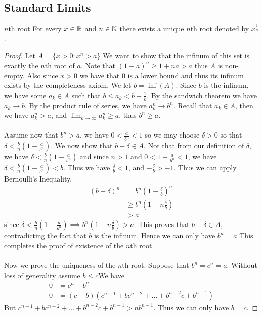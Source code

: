 \documentclass[a4paper]{article}
\begin{document}
\subsection{Standard Limits}
\begin{thm}{$n$th root}{} For every $x\in\mathbb{R}$ and $n\in\mathbb{N}$ there exists a unique $n$th root denoted by $x^\frac{1}{n}$. \tcbline
\begin{proof} Let $A=\{x>0:x^n>a\}$ We want to show that the infinum of this set is exactly the $n$th root of $a$. Note that $(1+a)^n\geq1+na>a$ thus $A$ is non-empty. Also since $x>0$ we have that $0$ is a lower bound and thus its infinum exists by the completeness axiom. We let $b=\inf(A)$. Since $b$ is the infinum, we have some $a_k\in A$ such that $b\leq a_k<b+\frac{1}{k}$. By the sandwich theorem we have $a_k\to b$. By the product rule of series, we have $a_k^n\to b^n$. Recall that $a_k\in A$, then we have $a_k^n>a$, and $\lim_{k\to\infty}a_k^n\geq a$, thus $b^n\geq a$. \\~\\
Assume now that $b^n>a$, we have $0<\frac{a}{b^n}<1$ so we may choose $\delta>0$ so that $\delta<\frac{b}{n}(1-\frac{a}{b^n})$. We now show that $b-\delta\in A$. Not that from our definition of $\delta$, we have $\delta<\frac{b}{n}(1-\frac{a}{b^n})$ and since $n>1$ and $0<1-\frac{a}{b^n}<1$, we have $\delta<\frac{b}{n}\left(1-\frac{a}{b^n}\right)<b$. Thus we have $\frac{\delta}{b}<1$, and $-\frac{\delta}{b}>-1$. Thus we can apply Bernoulli's Inequality. 
\begin{align*}
(b-\delta)^n&=b^n\left(1-\frac{\delta}{b}\right)^n \\
&\geq b^n\left(1-n\frac{\delta}{b}\right) \tag{By Bernoulli's Inequality} \\
&>a
\end{align*}
since $\delta<\frac{b}{n}\left(1-\frac{a}{b^n}\right)\implies b^n\left(1-n\frac{\delta}{b}\right)>a$. This proves that $b-\delta\in A$, contradicting the fact that $b$ is the infinum. Hence we can only have $b^n=a$ This completes the proof of existence of the $n$th root.\\~\\
Now we prove the uniqueness of the $n$th root. Suppose that $b^n=c^n=a$. Without loss of generality assume $b\leq c$We have
\begin{align*}
0&=c^n-b^n \\
0&=(c-b)(c^{n-1}+bc^{n-2}+\dots+b^{n-2}c+b^{n-1})
\end{align*}
But $c^{n-1}+bc^{n-2}+\dots+b^{n-2}c+b^{n-1}>nb^{n-1}$. Thus we can only have $b=c$. 
\end{proof}
\end{thm}
\end{document}
